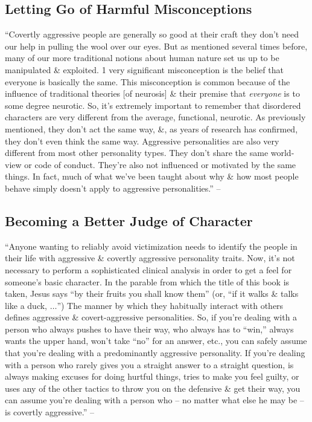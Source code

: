 \documentclass{article}
\numberwithin{equation}{section}
\begin{document}
\subsection{Letting Go of Harmful Misconceptions}
``Covertly aggressive people are generally so good at their craft they don't need our help in pulling the wool over our eyes. But as mentioned several times before, many of our more traditional notions about human nature set us up to be manipulated \& exploited. 1 very significant misconception is the belief that everyone is basically the same. This misconception is common because of the influence of traditional theories [of neurosis] \& their premise that \textit{everyone} is to some degree neurotic. So, it's extremely important to remember that disordered characters are very different from the average, functional, neurotic. As previously mentioned, they don't act the same way, \&, as years of research has confirmed, they don't even think the same way. Aggressive personalities are also very different from most other personality types. They don't share the same world-view or code of conduct. They're also not influenced or motivated by the same things. In fact, much of what we've been taught about why \& how most people behave simply doesn't apply to aggressive personalities.'' -- \cite[pp. 113--114]{Simon2010}

\subsection{Becoming a Better Judge of Character}
``Anyone wanting to reliably avoid victimization needs to identify the people in their life with aggressive \& covertly aggressive personality traits. Now, it's not necessary to perform a sophisticated clinical analysis in order to get a feel for someone's basic character. In the parable from which the title of this book is taken, Jesus says ``by their fruits you shall know them'' (or, ``if it walks \& talks like a duck, $\ldots$'') The manner by which they habitually interact with others defines aggressive \& covert-aggressive personalities. So, if you're dealing with a person who always pushes to have their way, who always has to ``win,'' always wants the upper hand, won't take ``no'' for an answer, etc., you can safely assume that you're dealing with a predominantly aggressive personality. If you're dealing with a person who rarely gives you a straight answer to a straight question, is always making excuses for doing hurtful things, tries to make you feel guilty, or uses any of the other tactics to throw you on the defensive \& get their way, you can assume you're dealing with a person who -- no matter what else he may be -- is covertly aggressive.'' -- \cite[pp. 114--115]{Simon2010}
\end{document}
